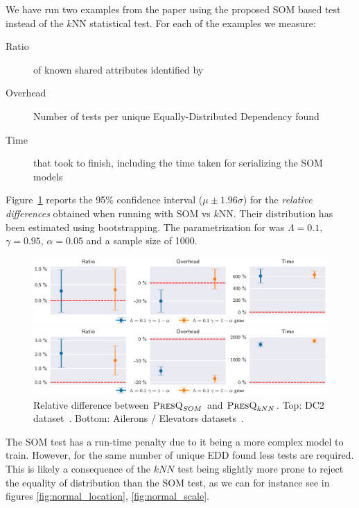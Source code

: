 We have run two examples from the \PresQ paper using the proposed \gls{SOM}  based test
instead of the $k$NN statistical test. For each of the examples we measure:

\begin{description}
    \item[Ratio] of known shared attributes identified by \PresQ
    \item[Overhead] Number of tests per unique Equally-Distributed Dependency found
    \item[Time] that took \PresQ to finish, including the time taken for serializing the \gls{SOM}  models
\end{description}

Figure~\ref{fig:presq_som} reports the 95\% confidence interval ($\mu \pm 1.96 \sigma$)
for the \emph{relative differences} obtained when running with \gls{SOM}  vs
$k$NN. Their distribution has been estimated using bootstrapping. The parametrization for
\PresQ was $\Lambda = 0.1$, $\gamma=0.95$, $\alpha=0.05$ and a sample size of 1000.

\begin{figure}[ht]
    \centering
    \includegraphics[width=\textwidth]{images/4_som/presq_som.eps}
    
    \includegraphics[width=\textwidth]{images/4_som/presq_som_aileron.eps}
    \caption{Relative difference between $\textsc{PresQ}_{SOM}$ and $\textsc{PresQ}_{kNN}$.
    Top: DC2 dataset~\cite{EuclidDesprez2020}.
    Bottom: Ailerons / Elevators datasets~\cite{alcala2011keel}.}
    \label{fig:presq_som}
\end{figure}

The \gls{SOM}  test has a run-time penalty due to it being a more complex model to train.
However, for the same number of unique EDD found less tests are required. This is likely a consequence of
the $kNN$ test being slightly more prone to reject the equality of distribution than the \gls{SOM} 
test, as we can for instance see in figures \ref{fig:normal_location}, \ref{fig:normal_scale}.

